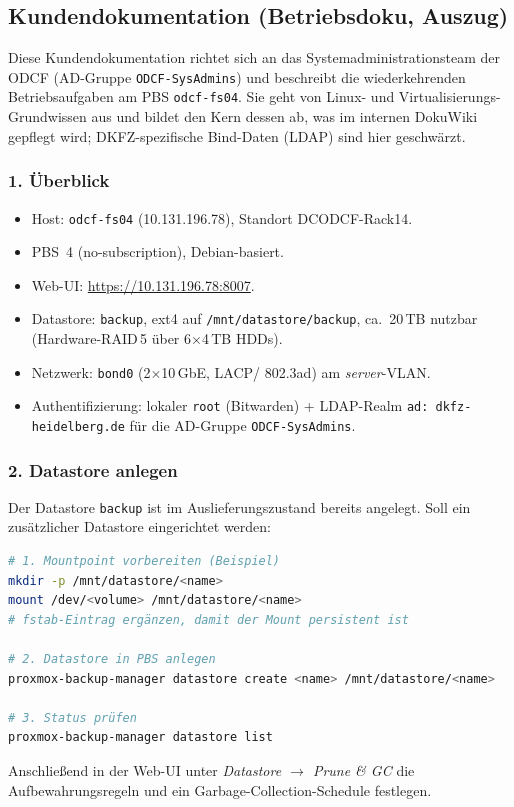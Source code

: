 \clearpage
\subsection{Kundendokumentation (Betriebsdoku, Auszug)}
\label{app:BetriebsDoku}

Diese Kundendokumentation richtet sich an das System\-administrations\-team
der \ac{ODCF} (AD-Gruppe \texttt{ODCF-SysAdmins}) und beschreibt die
wiederkehrenden Betriebsaufgaben am \ac{PBS} \texttt{odcf-fs04}.
Sie geht von Linux- und Virtualisierungs-Grundwissen aus und bildet
den Kern dessen ab, was im internen DokuWiki gepflegt wird;
DKFZ-spezifische Bind-Daten (LDAP) sind hier geschwärzt.

\subsubsection*{1. Überblick}
\begin{itemize}\setlength{\itemsep}{1pt}
    \item Host: \texttt{odcf-fs04} (10.131.196.78), Standort
          DCODCF-Rack14.
    \item \ac{PBS}~4 (no-subscription), Debian-basiert.
    \item Web-UI: \url{https://10.131.196.78:8007}.
    \item Datastore: \texttt{backup}, ext4 auf
          \texttt{/mnt/datastore/backup}, ca.\ 20\,TB nutzbar
          (Hardware-\ac{RAID}\,5 über 6$\times$4\,TB HDDs).
    \item Netzwerk: \texttt{bond0} (2$\times$10\,GbE, \ac{LACP}/
          802.3ad) am \emph{server}-\ac{VLAN}.
    \item Authentifizierung: lokaler \texttt{root} (Bitwarden) +
          \ac{LDAP}-Realm \texttt{ad: dkfz-heidelberg.de} für die
          \ac{AD}-Gruppe \texttt{ODCF-SysAdmins}.
\end{itemize}

\subsubsection*{2. Datastore anlegen}
Der Datastore \texttt{backup} ist im Auslieferungszustand bereits
angelegt. Soll ein zusätzlicher Datastore eingerichtet werden:
\begin{lstlisting}[language=bash,caption={Neuen Datastore anlegen}]
# 1. Mountpoint vorbereiten (Beispiel)
mkdir -p /mnt/datastore/<name>
mount /dev/<volume> /mnt/datastore/<name>
# fstab-Eintrag ergänzen, damit der Mount persistent ist

# 2. Datastore in PBS anlegen
proxmox-backup-manager datastore create <name> /mnt/datastore/<name>

# 3. Status prüfen
proxmox-backup-manager datastore list
\end{lstlisting}
Anschließend in der Web-UI unter \emph{Datastore $\to$ Prune \& GC}
die Aufbewahrungsregeln und ein Garbage-Collection-Schedule
festlegen.

